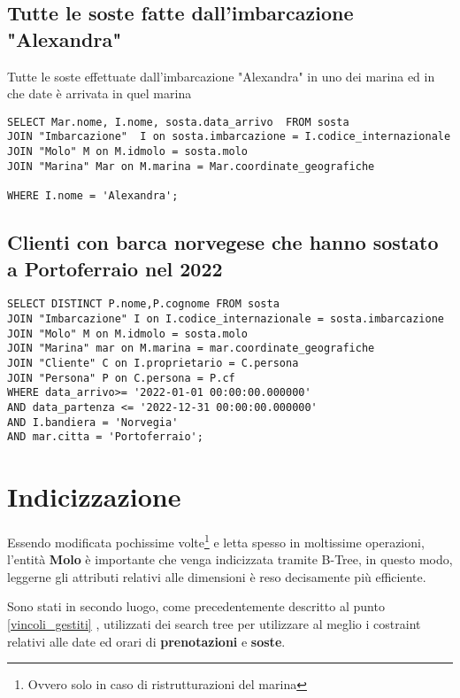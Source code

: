 \subsection{Tutte le soste fatte dall'imbarcazione "Alexandra"}

Tutte le soste effettuate dall'imbarcazione "Alexandra" in uno dei marina ed in che date è arrivata in quel marina

\begin{lstlisting}
SELECT Mar.nome, I.nome, sosta.data_arrivo  FROM sosta
JOIN "Imbarcazione"  I on sosta.imbarcazione = I.codice_internazionale
JOIN "Molo" M on M.idmolo = sosta.molo
JOIN "Marina" Mar on M.marina = Mar.coordinate_geografiche

WHERE I.nome = 'Alexandra';
\end{lstlisting}

\subsection{Clienti con barca norvegese che hanno sostato a Portoferraio nel 2022}

\begin{lstlisting}
SELECT DISTINCT P.nome,P.cognome FROM sosta
JOIN "Imbarcazione" I on I.codice_internazionale = sosta.imbarcazione
JOIN "Molo" M on M.idmolo = sosta.molo
JOIN "Marina" mar on M.marina = mar.coordinate_geografiche
JOIN "Cliente" C on I.proprietario = C.persona
JOIN "Persona" P on C.persona = P.cf
WHERE data_arrivo>= '2022-01-01 00:00:00.000000'
AND data_partenza <= '2022-12-31 00:00:00.000000'
AND I.bandiera = 'Norvegia'
AND mar.citta = 'Portoferraio';
\end{lstlisting}

\section{Indicizzazione}

Essendo modificata pochissime volte\footnote{Ovvero solo in caso di ristrutturazioni del marina} e letta spesso in moltissime operazioni, l'entità \textbf{Molo} è importante che venga indicizzata tramite B-Tree, in questo modo, leggerne gli attributi relativi alle dimensioni è reso decisamente più efficiente.

Sono stati in secondo luogo, come precedentemente descritto al punto \ref{vincoli_gestiti} , utilizzati dei search tree per utilizzare al meglio i costraint relativi alle date ed orari di \textbf{prenotazioni} e \textbf{soste}.
